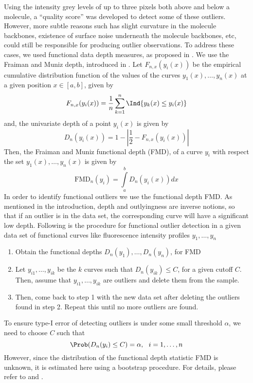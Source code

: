 Using the intensity grey levels of up to three pixels both above and below a molecule, a ``quality score'' was developed to detect some of these outliers. However, more subtle reasons such has slight curvature in the molecule backbones, existence of surface noise underneath the molecule backbones, etc, could still be responsible for producing outlier observations. To address these cases, we used functional data depth measures, as proposed in \cite{Febrero-Bande_etal_2007_Environmetrics}. We use the Fraiman and Muniz depth, introduced in \cite{Fraiman_Muniz_2001_SEIO}. Let $F_{n,x} (y_i (x))$ be the empirical cumulative distribution function of the values of the curves $y_1(x), \dots , y_n(x)$ at a given position $x \in [a, b]$, given by
\[ F_{n,x} (y_i (x)) = \frac{1}{n}\sum\limits_{k=1}^{n} \Ind\{ y_k(x) \leq y_i(x)\}\]
and, the univariate depth of a point $y_i(x)$ is given by
\[ D_n(y_i(x)) = 1 - \left| \frac{1}{2} - F_{n,x} (y_i (x)) \right| \]
Then, the Fraiman and Muniz functional depth (FMD), of a curve $y_i$ with respect the set $y_1(x), \dots , y_n(x)$ is given by 
\begin{equation}
\text{FMD}_n(y_i) = \int\limits_a^b D_n(y_i(x)) dx
\label{eq:3_depth}
\end{equation}
In order to identify functional outliers we use the functional depth FMD. As mentioned in the introduction, depth and outlyingness are inverse notions, so that if an outlier is in the data set, 
the corresponding curve will have a significant low depth. Following is the procedure for functional outlier detection in a given data set of functional curves like fluorescence intensity profiles
$y_1, \dots, y_n$
\begin{enumerate}
\item Obtain the functional depths $D_n(y_1), \dots, D_n(y_n)$, for FMD
\item Let $y_{i1}, \dots, y_{ik}$ be the $k$ curves such that $D_n(y_{ik}) \leq C$, for a given cutoff $C$. Then, assume that $y_{i1}, \dots, y_{ik}$ are outliers and delete them from the sample.
\item Then, come back to step 1 with the new data set after deleting the outliers found in step 2. Repeat this until no more outliers are found.
\end{enumerate}
To ensure type-I error of detecting outliers is under some small threshold $\alpha$, we need to choose $C$ such that
\[ \Prob(D_n(y_i) \leq C) = \alpha,\ \ i = 1, \dots, n\]
However, since the distribution of the functional depth statistic FMD is unknown, it is estimated here using a bootstrap procedure. For details, please refer to \cite{Febrero-Bande_etal_2007_Environmetrics} and \cite{Febrero-Bande_delaFuente_2012_JSS}. 

